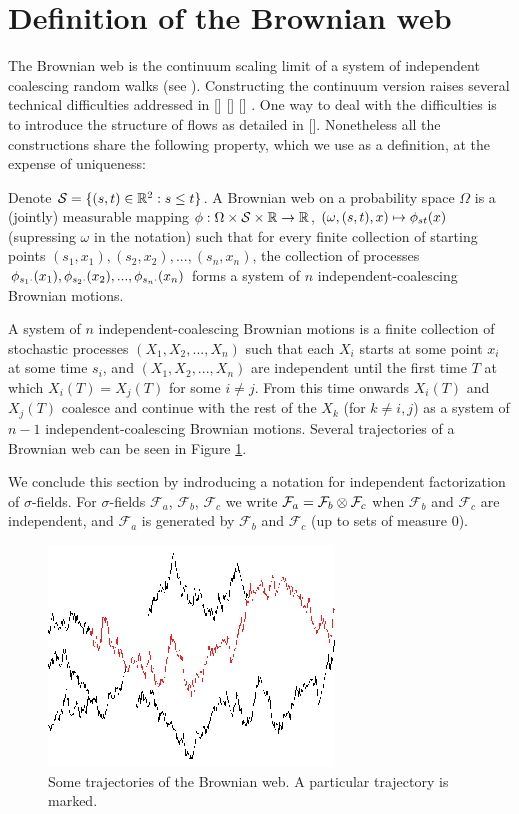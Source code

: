{
\section{Definition of the Brownian web}
\label{sec:brownian-web-definition}

The Brownian web is the continuum scaling limit of a system of
independent coalescing random walks (see
\cite{tsirelson-scaling-limit-noise-stability}).  Constructing the
continuum version raises several technical difficulties addressed in
[] [] [] . One way to deal with the difficulties is to introduce the
structure of flows as detailed in [].  Nonetheless all the
constructions share the following property, which we use as a
definition, at the expense of uniqueness:

  Denote $\mathcal{S}=\{(s, t) \in \mathbb{R}^2 : s \le t\}$.
  A Brownian web on a probability space $\Omega$ is a (jointly)
  measurable mapping $\phi : \Omega \times \mathcal{S} \times \mathbb{R}
  \to \mathbb{R}$, $(\omega, (s, t), x) \mapsto \phi_{{s}{t}}(x)$ (supressing
  $\omega$ in the notation) such that for every finite collection of
  starting points $(s_1, x_1),(s_2, x_2),...,(s_n, x_n)$, the
  collection of processes $\phi_{{s_1}{\cdot}}(x_1),
  \phi_{{s_2}{\cdot}}(x_2),...,\phi_{{s_n}{\cdot}}(x_n)$
  forms a system of $n$ independent-coalescing Brownian motions.

  A system of $n$ independent-coalescing Brownian motions is a finite
  collection of stochastic processes $(X_1, X_2,...,X_n)$ such that
  each $X_i$ starts at some point $x_i$ at some time $s_i$, and $(X_1,
  X_2,...,X_n)$ are independent until the first time $T$ at which
  $X_i(T)=X_j(T)$ for some $i\neq j$. From this time onwards $X_i(T)$
  and $X_j(T)$ coalesce and continue with the rest of the $X_k$ (for
  $k\neq i,j$) as a system of $n-1$ independent-coalescing Brownian motions.
  Several trajectories of a Brownian web can be seen in Figure
  \ref{fig:bw-trajectories}.

  \newcommand{\F}{\mathcal{F}}
We conclude this section by indroducing a notation for independent
factorization of $\sigma$-fields.
  For $\sigma$-fields $\F_a$, $\F_b$, $\F_c$ we write $\F_a = \F_b
  \tensor \F_c$ when $\F_b$ and $\F_c$ are independent, and $\F_a$
  is generated by $\F_b$ and $\F_c$ (up to sets of measure $0$).

\begin{figure}
   \centering
   \includegraphics[scale=2]{sometraj.eps}
   \caption{Some trajectories of the Brownian web. A particular trajectory is marked.}
  \label{fig:bw-trajectories}
\end{figure}
}
